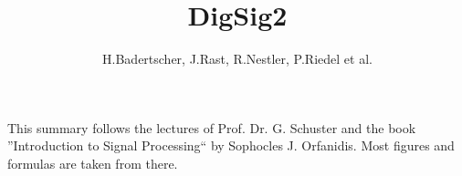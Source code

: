\documentclass{scrartcl}
\title{DigSig2}
\author{H.Badertscher, J.Rast, R.Nestler, P.Riedel et al.}
\begin{document}
\setcounter{tocdepth}{2}

\begin{titlepage}
	\maketitle
	\vfill
	\hspace{2cm}
	\begin{minipage}{0.6\linewidth}
		This summary follows the lectures of Prof. Dr. G. Schuster and the book 
		''Introduction to Signal Processing`` by Sophocles J. Orfanidis. Most
		figures and formulas are taken from there.	
	\end{minipage}	
\end{titlepage}

\newpage

\tableofcontents
\newpage


\begin{multicols}{2}

\newpage

\newpage

\end{multicols}




\newpage

\end{document}
